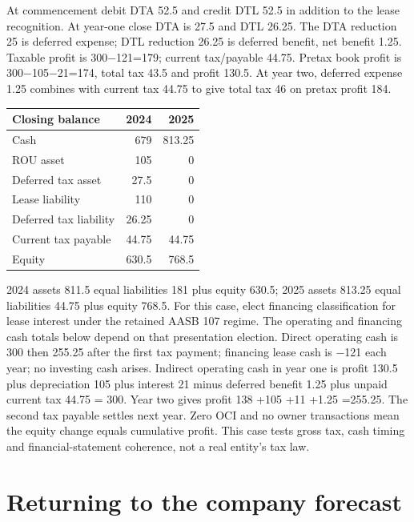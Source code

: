 At commencement debit DTA 52.5 and credit DTL 52.5 in addition to the lease recognition. At year-one close DTA is 27.5 and DTL 26.25. The DTA reduction 25 is deferred expense; DTL reduction 26.25 is deferred benefit, net benefit 1.25. Taxable profit is 300\ensuremath{-}121=179; current tax/payable 44.75. Pretax book profit is 300\ensuremath{-}105\ensuremath{-}21=174, total tax 43.5 and profit 130.5. At year two, deferred expense 1.25 combines with current tax 44.75 to give total tax 46 on pretax profit 184.

\begin{center}
\begin{tabular}{lrr}
\toprule Closing balance & 2024 & 2025\\\midrule
Cash & 679 & 813.25\\
ROU asset & 105 & 0\\
Deferred tax asset & 27.5 & 0\\
Lease liability & 110 & 0\\
Deferred tax liability & 26.25 & 0\\
Current tax payable & 44.75 & 44.75\\
Equity & 630.5 & 768.5\\\bottomrule
\end{tabular}
\end{center}


2024 assets 811.5 equal liabilities 181 plus equity 630.5; 2025 assets 813.25 equal liabilities 44.75 plus equity 768.5. For this case, elect financing classification for lease interest under the retained AASB 107 regime. The operating and financing cash totals below depend on that presentation election. Direct operating cash is 300 then 255.25 after the first tax payment; financing lease cash is \ensuremath{-}121 each year; no investing cash arises. Indirect operating cash in year one is profit 130.5 plus depreciation 105 plus interest 21 minus deferred benefit 1.25 plus unpaid current tax 44.75 = 300. Year two gives profit 138 +105 +11 +1.25 =255.25. The second tax payable settles next year. Zero OCI and no owner transactions mean the equity change equals cumulative profit. This case tests gross tax, cash timing and financial-statement coherence, not a real entity's tax law.



\hypertarget{returning-to-the-company-forecast}{%
\section{Returning to the company forecast}\label{method-corporate-methods-returning-to-the-company-forecast}}

